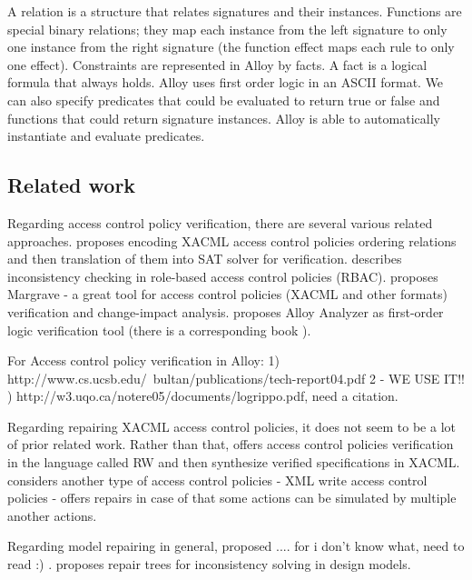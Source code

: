 \documentclass{acm_proc_article-sp}
\begin{document}
A relation is a structure that relates signatures and their instances. Functions are special binary relations; they map each instance from the left signature to only one instance from the right signature (the function effect maps each rule to only one effect). Constraints are represented in Alloy by facts. A fact is a logical formula that always holds. Alloy uses first order logic in an ASCII format. We can also specify predicates that could be evaluated to return true or false and functions that could return signature instances. Alloy is able to automatically instantiate and evaluate predicates.

\subsection{Related work}

Regarding access control policy verification, there are several various related approaches.
\cite{Hughes:2008:AVA:1459278.1459282} proposes encoding XACML access control policies  ordering relations and then translation of them into SAT solver for verification. \cite{4258517} describes inconsistency checking in role-based access control policies (RBAC).  \cite{Fisler:2005:VCA:1062455.1062502} proposes Margrave - a great tool for access control policies (XACML and other formats) verification and change-impact analysis. \cite{Jackson:2000:AFR:357474.355063} proposes Alloy Analyzer as first-order logic verification tool (there is a corresponding book \cite{jackson:alloy}).

For Access control policy verification in Alloy: 
1) http://www.cs.ucsb.edu/~bultan/publications/tech-report04.pdf
2 - WE USE IT!! ) http://w3.uqo.ca/notere05/documents/logrippo.pdf, need a citation.

Regarding repairing XACML access control policies, it does not seem to be a lot of prior related work. Rather than that, \cite{Zhang:2004:SVA:1029133.1029141} offers access control policies verification in the language called RW and then synthesize verified specifications in XACML. \cite{Bravo:2007:RIX:1783534.1783545} considers another type of access control policies - XML write access control policies - offers repairs in case of that some actions can be simulated by multiple another actions. 

Regarding model repairing in general, \cite{Xiong:2009:SAM:1595696.1595757} proposed .... for i don't know what, need to read :) . \cite{Reder:2012:CRT:2351676.2351707} proposes repair trees for inconsistency solving in design models.
\end{document}
